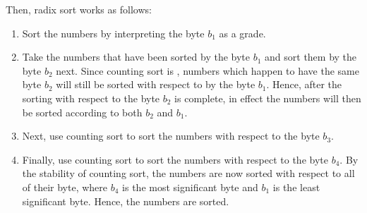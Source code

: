Then, radix sort works as follows:
\begin{enumerate}
\item Sort the numbers by interpreting the byte $b_1$ as a grade.
\item Take the numbers that have been sorted by the byte $b_1$ and sort them by the byte $b_2$ next.
      Since counting sort is , numbers which happen to have the same byte $b_2$ will still be
      sorted with respect to by the byte $b_1$.  Hence, after the sorting with respect to the byte $b_2$ is
      complete, in effect the numbers will then be sorted according to both $b_2$ and $b_1$.
\item Next, use counting sort to sort the numbers with respect to the byte $b_3$.
\item Finally, use counting sort to sort the numbers with respect to the byte $b_4$.  By the stability of
      counting sort, the numbers are now sorted with respect to all of their byte, where $b_4$ is the most
      significant byte and $b_1$ is the least significant byte. Hence, the numbers are sorted. 
\end{enumerate}


